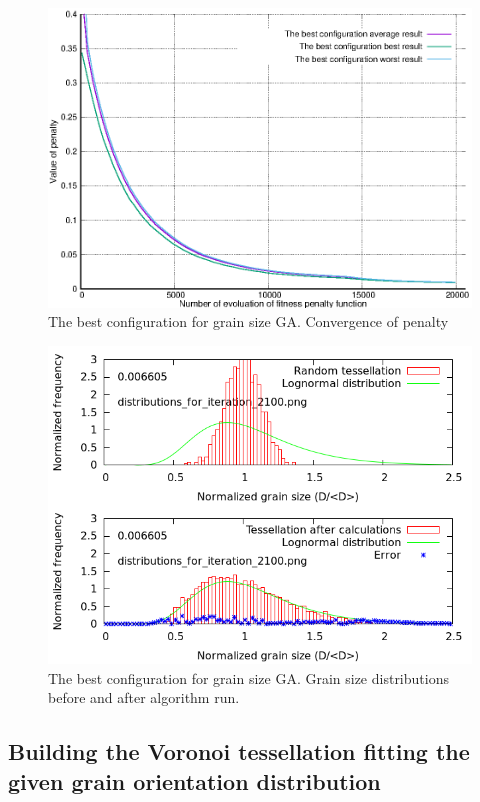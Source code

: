 \documentclass[12pt]{report}
\begin{document}
\begin{figure}
    \centering
    \includegraphics[width=5.0in]{best_config_sizealgo}
    \caption{The best configuration for grain size GA. Convergence of penalty}
    \label{bestconfigsize}
\end{figure}

\begin{figure}
    \centering
    \includegraphics[width=5.0in]{best_config_sizealgo_double}
    \caption{The best configuration for grain size GA. Grain size distributions before and after algorithm run.}
    \label{lastresult}
\end{figure}

\subsection{Building the Voronoi tessellation fitting the given grain orientation distribution}
\end{document}
